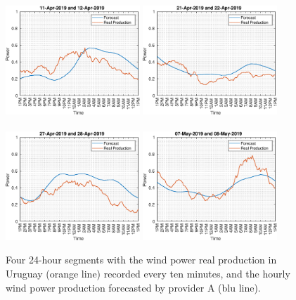 \documentclass[11pt]{article}
\theoremstyle{definition}
\begin{document}
\begin{figure}[H]
\centering
\includegraphics[width=0.45\textwidth]{plots/four_days/377.eps}
\includegraphics[width=0.45\textwidth]{plots/four_days/417.eps}\\
\quad\\
\includegraphics[width=0.45\textwidth]{plots/four_days/437.eps}
\includegraphics[width=0.45\textwidth]{plots/four_days/477.eps}
\caption{Four 24-hour segments with the wind power real production in Uruguay (orange line) recorded every ten minutes, and the hourly wind power production forecasted by provider A (blu line).}
  \label{fig:sample_data}
\end{figure}
\end{document}

